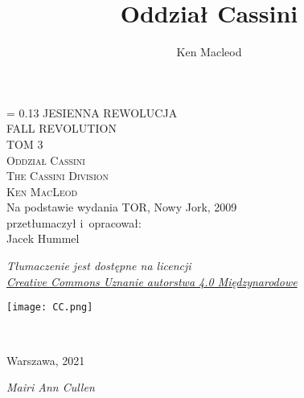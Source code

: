 \documentclass[oneside,polish,11pt,sfheadings]{mwbk}
\begin{document}
\title{Oddział Cassini}
\author{Ken Macleod}


\DeclareRobustCommand{\cs}[1]{\texttt{\char`\\#1}}
\newlength{\tpheight}\setlength{\tpheight}{0.9\textheight}
\newlength{\txtheight}\setlength{\txtheight}{0.9\tpheight}
\newlength{\tpwidth}\setlength{\tpwidth}{0.9\textwidth}
\newlength{\txtwidth}\setlength{\txtwidth}{0.9\tpwidth}
\newlength{\drop}
\newcommand*{\titleSI}{\begingroup%
\drop = 0.13\txtheight
\centering
{\Huge \textsf{JESIENNA REWOLUCJA}}\\[1\baselineskip]
{\huge \textsf{FALL REVOLUTION}}\\[1\baselineskip]
{\LARGE  \textsf{TOM 3}}\\[4\baselineskip]
{\Huge \textsc{Oddział Cassini}}\\[1\baselineskip]
{\LARGE \textsc{The Cassini Division}}\\[2\baselineskip]
{\huge \textsc{Ken MacLeod}}\\[4\baselineskip]
{\large Na podstawie wydania TOR, Nowy Jork, 2009 \\ przetłumaczył i~opracował:}\\
{\Large Jacek Hummel}\\[1\baselineskip]
{\normalsize \textit{Tłumaczenie jest dostępne na licencji\\
\href{https://creativecommons.org/licenses/by/4.0/deed.pl}{Creative Commons Uznanie autorstwa 4.0 Międzynarodowe}} \\ [1\baselineskip] \par}
\texttt{[image: CC.png]}

~

\vfill
{\Large {Warszawa, 2021}}\\
\endgroup}
\titleSI
\thispagestyle{empty}

\begin{figure}[p]
    \vspace*{-1cm}
\end{figure}
\thispagestyle{empty}

 
\newpage

\vspace*{2cm}
\thispagestyle{empty}

\emph{Mairi Ann Cullen}
\vspace*{2cm}
\end{document}
